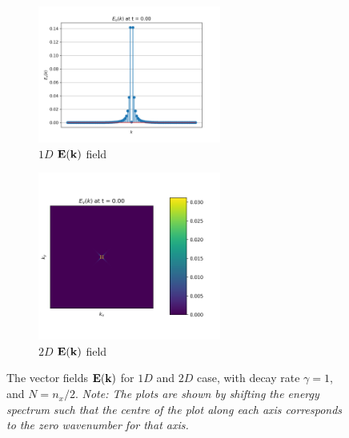 \begin{figure}[htbp!]
    \begin{subfigure}{7cm}
      \centering\includegraphics[width=6cm]{Code-Figures/sine-vel-prof-1d/EK_spectrum.png}
      \caption{$1D$ $\mathbf{E}(\mathbf{k})$ field}
    \end{subfigure}
    \begin{subfigure}{7cm}
      \centering\includegraphics[width=6cm]{Code-Figures/sine-vel-prof-2d/EK_spectrum.png}
      \caption{$2D$ $\mathbf{E}(\mathbf{k})$ field}
    \end{subfigure}
    \caption{The vector fields $\mathbf{E}(\mathbf{k})$ for $1D$ and $2D$ case, with decay rate $\gamma=1$, and $N=n_x/2$. \textit{Note: The plots are shown by shifting the energy spectrum such that the centre of the plot along each axis corresponds to the zero wavenumber for that axis.}}
    \label{fig:espec-vector-fields-gamma1}
\end{figure}

